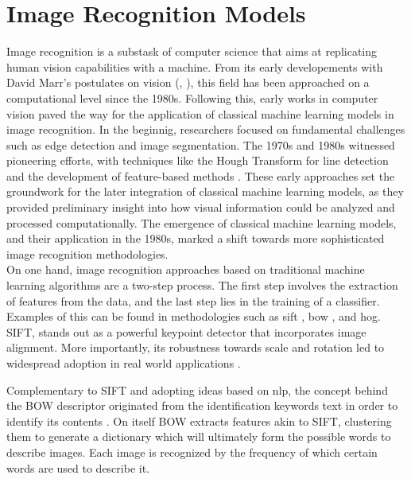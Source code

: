 \section{Image Recognition Models}
\label{rel:sec_imrecon}
Image recognition is a substask of computer science that aims at replicating human vision 
capabilities with a machine. From its early developements  with David Marr's postulates 
on vision (\cite{poggio1981marr}, \cite{marr2010vision}), this field has been approached on a 
computational level since the 1980s. Following this, early works in computer vision 
paved the way for the application of classical machine learning models in image recognition. In 
the beginnig, researchers focused on fundamental challenges such as edge detection and image 
segmentation. The 1970s and 1980s witnessed pioneering efforts, with 
techniques like the Hough Transform for line detection and the development of feature-based 
methods \autocite{duda1972use}. These early approaches set the groundwork for the later integration 
of classical machine learning models, as they provided preliminary insight into how visual 
information could be analyzed and processed computationally. The emergence of classical machine 
learning models, and their application in the 1980s, marked a shift towards more sophisticated 
image recognition methodologies.\\

\noindent On one hand, image recognition approaches based on traditional machine learning 
algorithms are a two-step process. The first step involves the extraction of features from the 
data, and the last step lies in the training of a classifier. Examples of this 
can be found in methodologies such as \gls{sift} \autocite{lowe1999object}, \gls{bow} 
\autocite{csurka2004visual}, and \gls{hog}. 
SIFT, stands out as a powerful keypoint detector that incorporates image alignment. 
More importantly, its robustness towards scale and rotation led to widespread adoption in real 
world applications \autocite{cruz2012scale}. 

Complementary to SIFT and adopting ideas based on 
\gls{nlp}, the concept behind the BOW descriptor originated from the identification keywords text 
in order to identify its contents \autocite{harris1954distributional}. On itself BOW extracts 
features akin to SIFT, clustering them to generate a dictionary which will ultimately form the 
possible words to describe images. Each image is recognized by the frequency of which certain 
words are used to describe it. 

